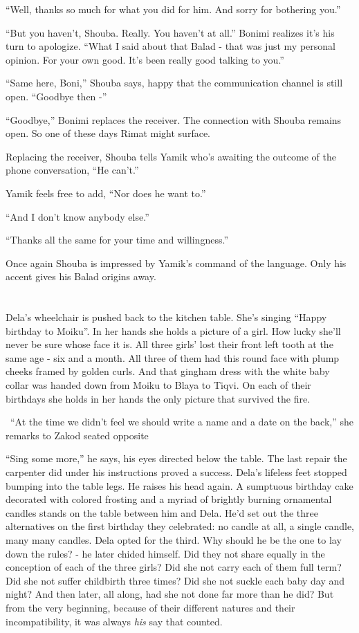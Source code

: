 \documentclass[twoside,11pt]{book}
\begin{document}
``Well, thanks so much for what you did for him. And sorry for bothering you.''

``But you haven't, Shouba. Really. You haven't at all.'' Bonimi realizes it's his turn to
apologize. ``What I said about that Balad - that was just my personal opinion. For your own good. It's
been really good talking to you.''

``Same here, Boni,'' Shouba says, happy that the communication channel is still open.
``Goodbye then -''

``Goodbye,'' Bonimi replaces the receiver. The connection with Shouba remains open. So one of
these days Rimat might surface.

Replacing the receiver, Shouba tells Yamik who's awaiting the outcome of the phone conversation, ``He
can't.''

Yamik feels free to add, ``Nor does he want to.''

``And I don't know anybody else.''

``Thanks all the same for your time and willingness.''

Once again Shouba is impressed by Yamik's command of the language. Only his accent gives his Balad origins away.



\chapter{}

Dela's wheelchair is pushed back to the kitchen table. She's singing ``Happy birthday to
Moiku''.  In her hands she holds a picture of a girl. How lucky she'll never be sure whose face it is. All
three girls' lost their front left tooth at the same age - six and a month. All three of them had this round face with
plump cheeks framed by golden curls. And that gingham dress with the white baby collar was handed down from Moiku to
Blaya to Tiqvi. On each of their birthdays she holds in her hands the only picture that survived the fire.

\ ``At the time we didn't feel we should write a name and a date on the back,'' she remarks to
Zakod seated opposite

``Sing some more,'' he says, his eyes directed below the table. The last repair the carpenter
did under his instructions proved a success. Dela's lifeless feet stopped bumping into the table legs. He raises his
head again. A sumptuous birthday cake decorated with colored frosting and a myriad of brightly burning ornamental
candles stands on the table between him and Dela. He'd set out the three alternatives on the first birthday they
celebrated: no candle at all, a single candle, many many candles.  Dela opted for the third. Why should he be the one
to lay down the rules? - he later chided himself. Did they not share equally in the conception of each of the three
girls? Did she not carry each of them full term? Did she not suffer childbirth three times? Did she not suckle each
baby day and night? And then later, all along, had she not done far more than he did? But from the very beginning,
because of their different natures and their incompatibility, it was always \textit{his} say that counted.
\end{document}
